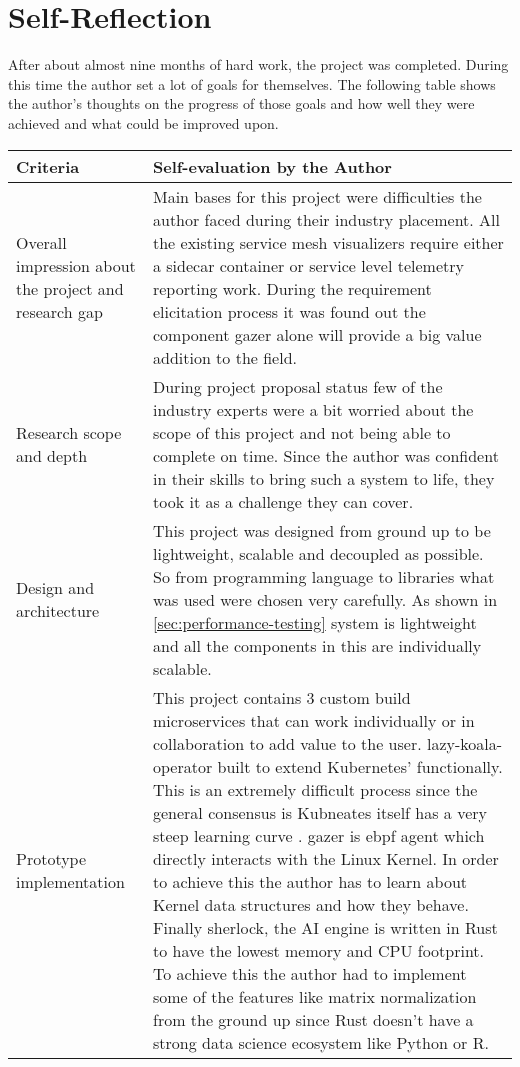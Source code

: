 \section{Self-Reflection}

After about almost nine months of hard work, the project was completed. During this time the author set a lot of goals for themselves. The following table shows the author's thoughts on the progress of those goals and how well they were achieved and what could be improved upon.

\begin{longtable}{|p{33mm}|p{120mm}|}
    \hline
    \textbf{Criteria} &
    \textbf{Self-evaluation by the Author} \\ \hline
  Overall impression about the project and research gap &
    Main bases for this project were difficulties the author faced during their industry placement. All the existing service mesh visualizers require either a sidecar container or service level telemetry reporting work. During the requirement elicitation process it was found out the component \ac{gazer} alone will provide a big value addition to the field. \\ \hline
  Research scope and depth &
    During project proposal status few of the industry experts were a bit worried about the scope of this project and not being able to complete on time. Since the author was confident in their skills to bring such a system to life, they took it as a challenge they can cover. \\ \hline
  Design and architecture &
    This project was designed from ground up to be lightweight, scalable and decoupled as possible. So from programming language to libraries what was used were chosen very carefully. As shown in \ref{sec:performance-testing} system is lightweight and all the components in this are individually scalable. \\ \hline
  Prototype implementation &
    This project contains 3 custom build microservices that can work individually or in collaboration to add value to the user. \ac{lazy-koala-operator} built to extend Kubernetes' functionally. This is an extremely difficult process since the general consensus is Kubneates itself has a very steep learning curve \citep{Googlead4:online}. \ac{gazer} is \ac{ebpf} agent which directly interacts with the Linux Kernel. In order to achieve this the author has to learn about Kernel data structures and how they behave. Finally \ac{sherlock}, the AI engine is written in Rust to have the lowest memory and CPU footprint. To achieve this the author had to implement some of the features like matrix normalization from the ground up since Rust doesn't have a strong data science ecosystem like Python or R. \\ \hline

\end{longtable}
